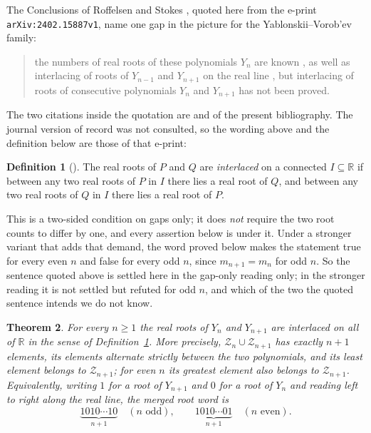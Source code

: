 \documentclass[11pt]{amsart}
\newtheorem{theorem}{Theorem}
\theoremstyle{definition}
\newtheorem{definition}[theorem]{Definition}
\newcommand{\Zs}{\mathcal Z}
\begin{document}
The Conclusions of Roffelsen and Stokes \cite{RS}, quoted here from the e-print
\texttt{arXiv:2402.15887v1}, name one gap in the picture for the
Yablonskii--Vorob'ev family:

\begin{quote}
the numbers of real roots of these polynomials $Y_n$ are known
\cite{Roffelsen2012}, as well as interlacing of roots of $Y_{n-1}$ and
$Y_{n+1}$ on the real line \cite{ClarksonCMFT}, but interlacing of roots of
consecutive polynomials $Y_n$ and $Y_{n+1}$ has not been proved.
\end{quote}

\noindent
The two citations inside the quotation are \cite{Roffelsen2012} and
\cite{ClarksonCMFT} of the present bibliography. The journal version of record
was not consulted, so the wording above and the definition below are those of
that e-print:

\begin{definition}[\cite{RS}]\label{def:interlace}
The real roots of $P$ and $Q$ are \emph{interlaced} on a connected
$I\subseteq\mathbb R$ if between any two real roots of $P$ in $I$ there lies a
real root of $Q$, and between any two real roots of $Q$ in $I$ there lies a
real root of $P$.
\end{definition}

\noindent
This is a two-sided condition on gaps only; it does \emph{not} require the two
root counts to differ by one, and every assertion below is under it. Under a
stronger variant that adds that demand, the word proved below makes the
statement true for every even $n$ and false for every odd $n$, since
$m_{n+1}=m_n$ for odd $n$. So the sentence quoted above is settled here in the
gap-only reading only; in the stronger reading it is not settled but refuted for
odd $n$, and which of the two the quoted sentence intends we do not know.

\begin{theorem}\label{thm:main}
For every $n\ge1$ the real roots of $Y_n$ and $Y_{n+1}$ are interlaced on all
of $\mathbb R$ in the sense of Definition~\ref{def:interlace}. More precisely,
$\Zs_n\cup\Zs_{n+1}$ has exactly $n+1$ elements, its elements alternate
strictly between the two polynomials, and its least element belongs to
$\Zs_{n+1}$; for even $n$ its greatest element also belongs to $\Zs_{n+1}$.
Equivalently, writing $1$ for a root of $Y_{n+1}$ and $0$ for a root of $Y_n$
and reading left to right along the real line, the merged root word is
\[
 \underbrace{1010\cdots10}_{n+1}\quad(n\text{ odd}),
 \qquad
 \underbrace{1010\cdots01}_{n+1}\quad(n\text{ even}).
\]
\end{theorem}
\end{document}
